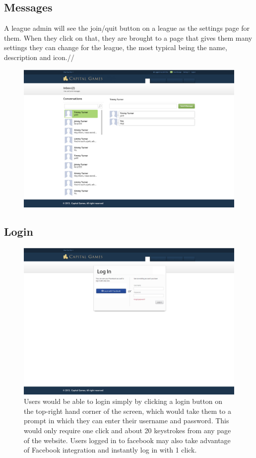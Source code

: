 \subsection{Messages}
A league admin will see the join/quit button on a league as the settings page for them. When they click on that, they are brought to a page that gives them many settings they can change for the league, the most typical being the name, description and icon.//
\begin{figure}
\centering
\includegraphics[width=5.5in]{./mockups/JPEG/messages.jpg}
\end{figure}
\subsection{Login}
{
\begin{figure}
\centering
\includegraphics[width=5.5in]{./mockups/JPEG/Login.jpg}
\caption{Users would be able to login simply by clicking a login button on the top-right hand corner of the screen, which would take them to a prompt in which they can enter their username and password. This would only require one click and about 20 keystrokes from any page of the website. Users logged in to facebook may also take advantage of Facebook integration and instantly log in with 1 click.}
\end{figure}
}

